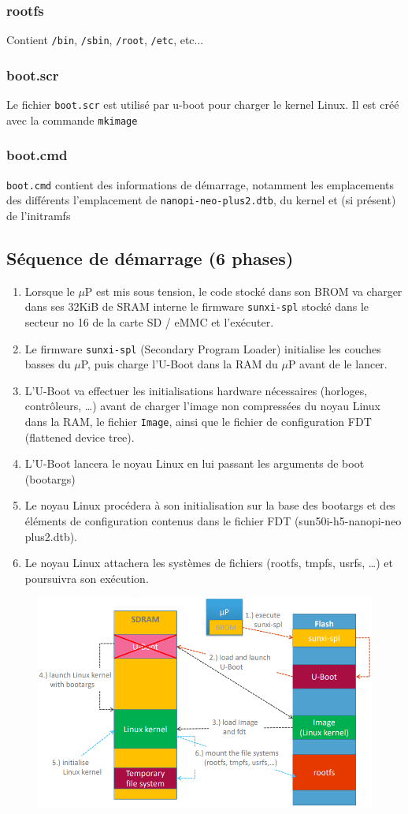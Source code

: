 \documentclass[resume]{subfiles}
\begin{document}
\subsubsection{rootfs}
Contient \verb!/bin!, \verb!/sbin!, \verb!/root!, \verb!/etc!, etc...
\subsubsection{boot.scr}
Le fichier \verb!boot.scr! est utilisé par u-boot pour charger le kernel Linux. Il est créé avec la commande \verb!mkimage!
\subsubsection{boot.cmd}
\verb!boot.cmd! contient des informations de démarrage, notamment les emplacements des différents l'emplacement de \verb!nanopi-neo-plus2.dtb!, du kernel et (si présent) de l'initramfs

\subsection{Séquence de démarrage (6 phases)}
\begin{enumerate}
\item Lorsque le $\mu$P est mis sous tension, le code stocké dans son BROM va charger dans ses 32KiB de SRAM interne le firmware \verb!sunxi-spl! stocké dans le secteur no 16 de la carte SD / eMMC et l’exécuter. 
\item Le firmware \verb!sunxi-spl! (Secondary Program Loader) initialise les couches basses du $\mu$P, puis charge l'U-Boot dans la RAM du $\mu$P avant de le lancer.
\item L'U-Boot va effectuer les initialisations hardware nécessaires (horloges, contrôleurs, …) avant de charger l’image non compressées du noyau Linux dans la RAM, le fichier \verb!Image!, ainsi que le fichier de configuration FDT (flattened device tree).
\item L'U-Boot lancera le noyau Linux en lui passant les arguments de boot (bootargs)
\item Le noyau Linux procédera à son initialisation sur la base des bootargs et des éléments de configuration contenus dans le fichier FDT (sun50i-h5-nanopi-neo plus2.dtb).
\item Le noyau Linux attachera les systèmes de fichiers (rootfs, tmpfs, usrfs, …) et poursuivra son exécution.
\end{enumerate}

\begin{figure}[H]
\centering
\includegraphics[width=\columnwidth]{img_4.png}
\end{figure}
\end{document}
